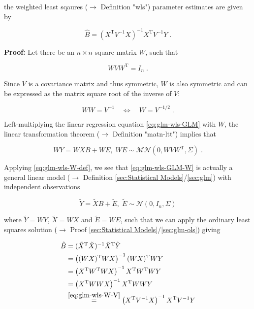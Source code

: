 \documentclass[a4paper,12pt,twoside]{book}
\begin{document}
the weighted least sqaures ($\rightarrow$ Definition "wls") parameter estimates are given by

\begin{equation} \label{eq:glm-wls-WLS}
\hat{B} = (X^\mathrm{T} V^{-1} X)^{-1} X^\mathrm{T} V^{-1} Y \; .
\end{equation}


\vspace{1em}
\textbf{Proof:} Let there be an $n \times n$ square matrix $W$, such that

\begin{equation} \label{eq:glm-wls-W-def}
W V W^\mathrm{T} = I_n \; .
\end{equation}

Since $V$ is a covariance matrix and thus symmetric, $W$ is also symmetric and can be expressed as the matrix square root of the inverse of $V$:

\begin{equation} \label{eq:glm-wls-W-V}
W W = V^{-1} \quad \Leftrightarrow \quad W = V^{-1/2} \; .
\end{equation}

Left-multiplying the linear regression equation \eqref{eq:glm-wls-GLM} with $W$, the linear transformation theorem ($\rightarrow$ Definition "matn-ltt") implies that

\begin{equation} \label{eq:glm-wls-GLM-W}
WY = WXB + WE, \; WE \sim \mathcal{MN}(0, W V W^\mathrm{T}, \Sigma) \; .
\end{equation}

Applying \eqref{eq:glm-wls-W-def}, we see that \eqref{eq:glm-wls-GLM-W} is actually a general linear model ($\rightarrow$ Definition \ref{sec:Statistical Models}/\ref{sec:glm}) with independent observations

\begin{equation} \label{eq:glm-wls-GLM-W-dev}
\tilde{Y} = \tilde{X}B + \tilde{E}, \; \tilde{E} \sim \mathcal{N}(0, I_n, \Sigma)
\end{equation}

where $\tilde{Y} = WY$, $\tilde{X} = WX$ and $\tilde{E} = WE$, such that we can apply the ordinary least squares solution ($\rightarrow$ Proof \ref{sec:Statistical Models}/\ref{sec:glm-ols}) giving

\begin{equation} \label{eq:glm-wls-WLS-qed}
\begin{split}
\hat{B} &= (\tilde{X}^\mathrm{T} \tilde{X})^{-1} \tilde{X}^\mathrm{T} \tilde{Y} \\
&= \left( (WX)^\mathrm{T} WX \right)^{-1} (WX)^\mathrm{T} WY \\
&= \left( X^\mathrm{T} W^\mathrm{T} W X \right)^{-1} X^\mathrm{T} W^\mathrm{T} W Y \\
&= \left( X^\mathrm{T} W W X \right)^{-1} X^\mathrm{T} W W Y \\
&\overset{\eqref{eq:glm-wls-W-V}}{=} \left( X^\mathrm{T} V^{-1} X \right)^{-1} X^\mathrm{T} V^{-1} Y
\end{split}
\end{equation}
\end{document}

